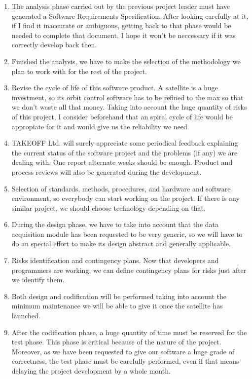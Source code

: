 \documentclass{article}
\begin{document}
\begin{enumerate}
\item The analysis phase carried out by the previous project leader must have generated a Software Requirements Specification. After looking carefully at it, if I find it inaccurate or ambiguous, getting back to that phase would be needed to complete that document. I hope it won't be neccessary if it was correctly develop back then.

\item Finished the analysis, we have to make the selection of the methodology we plan to work with for the rest of the project. 

\item Revise the cycle of life of this software product. A satellite is a huge investment, so its orbit control software has to be refined to the max so that we don't waste all that money. Taking into account the huge quantity of risks of this project, I consider beforehand that an spiral cycle of life would be appropiate for it and would give us the reliability we need.

\item TAKEOFF Ltd. will surely appreciate some periodical feedback explaining the current status of the software project and the problems (if any) we are dealing with. One report alternate weeks should be enough. Product and process reviews will also be generated during the development.

\item Selection of standards, methods, procedures, and hardware and software environment, so everybody can start working on the project. If there is any similar project, we should choose technology depending on that.

\item During the design phase, we have to take into account that the data acquisition module has been requested to be very generic, so we will have to do an special effort to make its design abstract and generally applicable.

\item Risks identification and contingency plans. Now that developers and programmers are working, we can define contingency plans for risks just after we identify them.

\item Both design and codification will be performed taking into account the minimum maintenance we will be able to give it once the satellite has launched. 

\item After the codification phase, a huge quantity of time must be reserved for the test phase. This phase is critical because of the nature of the project. Moreover, as we have been requested to give our software a huge grade of correctness, the test phase must be carefully performed, even if that means delaying the project development by a whole month.



\end{enumerate}
\end{document}
